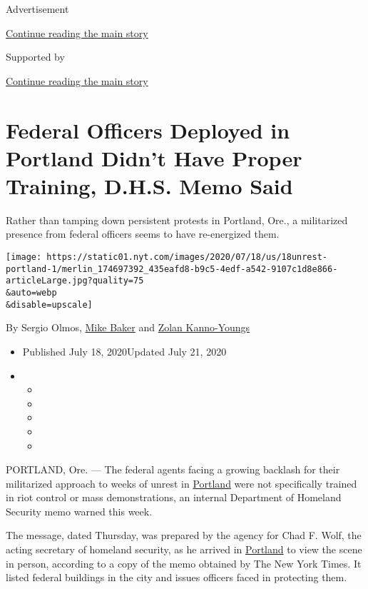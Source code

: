 Advertisement

\protect\hyperlink{after-top}{Continue reading the main story}

Supported by

\protect\hyperlink{after-sponsor}{Continue reading the main story}

\hypertarget{federal-officers-deployed-in-portland-didnt-have-proper-training-dhs-memo-said}{%
\section{Federal Officers Deployed in Portland Didn't Have Proper
Training, D.H.S. Memo
Said}\label{federal-officers-deployed-in-portland-didnt-have-proper-training-dhs-memo-said}}

Rather than tamping down persistent protests in Portland, Ore., a
militarized presence from federal officers seems to have re-energized
them.

\texttt{[image: https://static01.nyt.com/images/2020/07/18/us/18unrest-portland-1/merlin\_174697392\_435eafd8-b9c5-4edf-a542-9107c1d8e866-articleLarge.jpg?quality=75\\\&auto=webp\\\&disable=upscale]}

By Sergio Olmos, \href{https://www.nytimes.com/by/mike-baker}{Mike
Baker} and \href{https://www.nytimes.com/by/zolan-kanno-youngs}{Zolan
Kanno-Youngs}

\begin{itemize}
\item
  Published July 18, 2020Updated July 21, 2020
\item
  \begin{itemize}
  \item
  \item
  \item
  \item
  \item
  \end{itemize}
\end{itemize}

PORTLAND, Ore. --- The federal agents facing a growing backlash for
their militarized approach to weeks of unrest in
\href{https://www.nytimes.com/2020/07/21/us/portland-protests.html}{Portland}
were not specifically trained in riot control or mass demonstrations, an
internal Department of Homeland Security memo warned this week.

The message, dated Thursday, was prepared by the agency for Chad F.
Wolf, the acting secretary of homeland security, as he arrived in
\href{https://www.nytimes.com/2020/07/21/us/portland-protests.html}{Portland}
to view the scene in person, according to a copy of the memo obtained by
The New York Times. It listed federal buildings in the city and issues
officers faced in protecting them.

